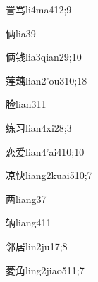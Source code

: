 \begin{verbete}{詈骂}{li4ma4}{12;9}
\end{verbete}

\begin{verbete}{俩}{lia3}{9}
\end{verbete}

\begin{verbete}{俩钱}{lia3qian2}{9;10}
\end{verbete}

\begin{verbete}{莲藕}{lian2'ou3}{10;18}
\end{verbete}

\begin{verbete}{脸}{lian3}{11}
\end{verbete}

\begin{verbete}{练习}{lian4xi2}{8;3}
\end{verbete}

\begin{verbete}{恋爱}{lian4'ai4}{10;10}
\end{verbete}

\begin{verbete}{凉快}{liang2kuai5}{10;7}
\end{verbete}

\begin{verbete}{两}{liang3}{7}
\end{verbete}

\begin{verbete}{辆}{liang4}{11}
\end{verbete}

\begin{verbete}{邻居}{lin2ju1}{7;8}
\end{verbete}

\begin{verbete}{菱角}{ling2jiao5}{11;7}
\end{verbete}

